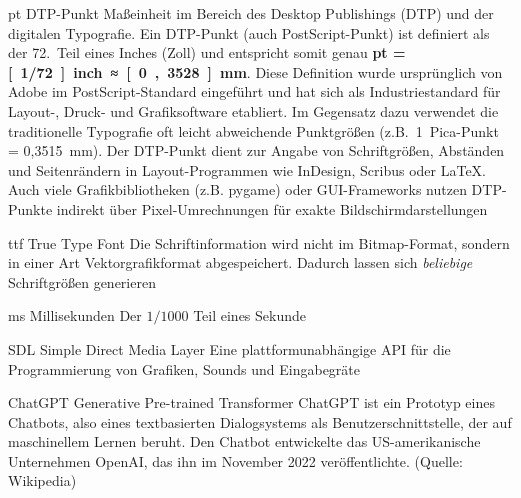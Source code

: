   {pt}            %
  {DTP-Punkt}  %
  {
  	Maßeinheit im Bereich des Desktop Publishings (DTP) und der digitalen Typografie. Ein DTP-Punkt (auch PostScript-Punkt) ist definiert als der 72.~Teil eines Inches (Zoll) und entspricht somit genau \textbf{\unit[1]{pt} = \unit[1/72]{inch} ≈ \unit[0{,}3528]{mm}}. Diese Definition wurde ursprünglich von Adobe im PostScript-Standard eingeführt und hat sich als Industriestandard für Layout-, Druck- und Grafiksoftware etabliert. Im Gegensatz dazu verwendet die traditionelle Typografie oft leicht abweichende Punktgrößen (z.B.~1~Pica-Punkt = 0{,}3515~mm).
	Der DTP-Punkt dient zur Angabe von Schriftgrößen, Abständen und Seitenrändern in Layout-Programmen wie InDesign, Scribus oder LaTeX. Auch viele Grafikbibliotheken (z.B. \gls{pygame}) oder GUI-Frameworks nutzen DTP-Punkte indirekt über Pixel-Umrechnungen für exakte Bildschirmdarstellungen
  	} %

  {ttf}            %
  {True Type Font}  %
  {Die Schriftinformation wird nicht im Bitmap-Format, sondern in einer Art Vektorgrafikformat abgespeichert. Dadurch lassen sich \emph{beliebige} Schriftgrößen generieren} %

  {ms}            %
  {Millisekunden}  %
  {Der $1/1000$ Teil eines Sekunde} %

{SDL}            %
{Simple Direct Media Layer}  %
{Eine plattformunabhängige API für die Programmierung von Grafiken, Sounds und Eingabegräte} %

	{ChatGPT}
    {Generative Pre-trained Transformer}  %
	{ChatGPT ist ein Prototyp eines Chatbots, also eines textbasierten Dialogsystems als Benutzerschnittstelle, der auf maschinellem Lernen beruht. Den Chatbot entwickelte das US-amerikanische Unternehmen OpenAI, das ihn im November 2022 veröffentlichte. (Quelle: Wikipedia)}






